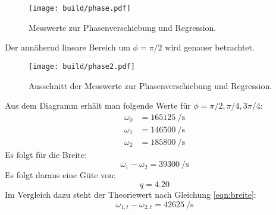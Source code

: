 \begin{figure}[H]
    \centering
    \caption{Messwerte zur Phasenverschiebung und Regression.}
    \label{fig:phase}
    \texttt{[image: build/phase.pdf]}
\end{figure}
\noindent
Der annähernd lineare Bereich um $\phi=\pi/2$ wird genauer betrachtet.
\begin{figure}[H]
    \centering
    \caption{Ausschnitt der Messwerte zur Phasenverschiebung und Regression.}
    \label{fig:phase2}
    \texttt{[image: build/phase2.pdf]}
\end{figure}
\noindent
Aus dem Diagramm erhält man folgende Werte für $\phi=\pi/2, \pi/4, 3\pi/4$:
\begin{align}
    \omega_0 &= \SI{165125}{\per\second} \\ 
    \omega_1 &= \SI{146500}{\per\second} \\ 
    \omega_2 &= \SI{185800}{\per\second}
\end{align}
Es folgt für die Breite:
\begin{equation}
    \omega_1-\omega_2 = \SI{39300}{\per\second}
\end{equation}
Es folgt daraus eine Güte von:
\begin{equation}
    q=4.20
\end{equation}
Im Vergleich dazu steht der Theoriewert nach Gleichung \eqref{eqn:breite}:
\begin{equation}
    \omega_{1,t}-\omega_{2,t} = \SI{42625}{\per\second}
\end{equation}
%
